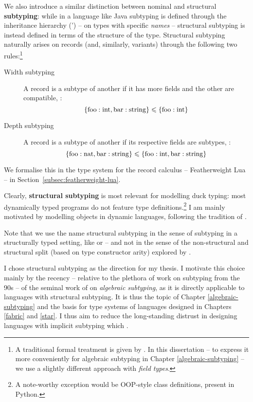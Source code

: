 We also introduce a similar distinction between nominal and structural \textbf{subtyping}: while in a language like Java subtyping is defined through the inheritance hierarchy (') -- on types with specific \emph{names} -- structural subtyping is instead defined in terms of the structure of the type. Structural subtyping naturally arises on records (and, similarly, variants) through the following two rules:\footnote{A traditional formal treatment is given by \textcite{tapl}. In this dissertation -- to express it more conveniently for algebraic subtyping in Chapter \ref{algebraic-subtyping} -- we use a slightly different approach with \emph{field types}.}
\begin{description}
    \item[Width subtyping] A record is a subtype of another if it has more fields and the other are compatible, \eg{}: $$ \{ \mathrm{foo} : \mathrm{int}, \mathrm{bar} : \mathrm{string} \} \leqslant \{ \mathrm{foo} : \mathrm{int} \} $$
    \item[Depth subtyping] A record is a subtype of another if its respective fields are subtypes, \eg{}:
    $$ \{ \mathrm{foo}: \mathrm{nat}, \mathrm{bar}: \mathrm{string} \} \leqslant \{ \mathrm{foo}: \mathrm{int}, \mathrm{bar}: \mathrm{string} \} $$
\end{description}

We formalise this in the type system for the record calculus -- Featherweight Lua -- in Section~\ref{subsec:featherweight-lua}.

\needspace{5em}
Clearly, \textbf{structural subtyping} is most relevant for modelling duck typing: most dynamically typed programs do not feature type definitions.\footnote{A note-worthy exception would be OOP-style class definitions, present in \eg{} Python.} I am mainly motivated by modelling objects in dynamic languages, following the tradition of \textcite{cardelli-multiple-inheritance}.

Note that we use the name structural subtyping in the sense of subtyping in a structurally typed setting, like \textcite{dolan-thesis} or \textcite{cardelli-power-type} -- and not in the sense of the non-structural and structural split (based on type constructor arity) explored by \eg{} \textcite{subtyping-decidability}.

I chose structural subtyping as the direction for my thesis. I motivate this choice mainly by the recency -- relative to the plethora of work on subtyping from the 90s -- of the seminal work of \textcite{mlsub} on \emph{algebraic subtyping}, as it is directly applicable to languages with structural subtyping. It is thus the topic of Chapter \ref{algebraic-subtyping} and the basis for type systems of languages designed in Chapters \ref{fabric} and \ref{star}.
I thus aim to reduce the long-standing distrust in designing languages with implicit subtyping which \cite{linear-haskell}.
 
